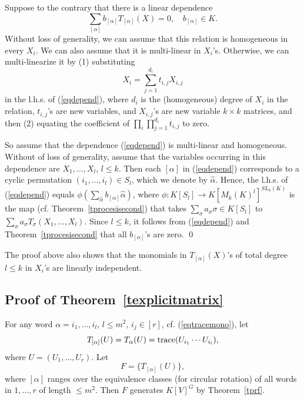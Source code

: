 \documentclass[11pt]{article}
\begin{document}
\proof 
Suppose to the contrary that there is a linear dependence 
\begin{equation} \label{eqdepend}
 \sum_{[\alpha]} b_{[\alpha]} T_{[\alpha]}(X)  = 0, \quad b_{[\alpha]} \in K.
\end{equation} 
Without loss of generality, we can assume that this relation is homogeneous 
in every $X_i$. We can also assume that it is multi-linear
in $X_i$'s. 
Otherwise, we can multi-linearize it by (1) substituting
\[ X_i=\sum_{j=1}^{d_i} t_{i,j} X_{i,j}\] 
in the l.h.s. of (\ref{eqdepend}),
where $d_i$ is the (homogeneous) degree of $X_i$ in the relation, $t_{i,j}$'s  are new variables, and $X_{i,j}$'s 
are new variable $k\times k$ matrices, and then (2)
equating  the coefficient of $\prod_i \prod_{j=1}^{d_i} t_{i,j}$ to zero.


So assume that the dependence (\ref{eqdepend})  is multi-linear and homogeneous. Without of loss of generality,
assume that the variables occurring in this dependence are $X_1,\ldots,X_l$, $l \le k$. Then each  $[\alpha]$
in (\ref{eqdepend})  corresponds to a cyclic 
permutation $(i_1,\ldots,i_l) \in S_l$, which we denote by $\hat \alpha$.
Hence, the l.h.s. of (\ref{eqdepend}) equals $\phi(\sum_{\hat \alpha} b_{[\alpha]} \hat \alpha)$,
where $\phi: K[S_l]\rightarrow K[M_k(K)^l]^{SL_k(K)}$ is the map (cf. Theorem~\ref{tprocesisecond}) that takes 
$\sum_\sigma a_\sigma \sigma \in K[S_l]$ to $\sum_\sigma a_\sigma T_\sigma(X_1,\ldots,X_l)$.  
Since $l \le k$, it  follows from  (\ref{eqdepend}) and  Theorem~\ref{tprocesisecond} that 
all $b_{[\alpha]}$'s are  zero.
\qed 

 The proof above also shows that 
the monomials in $T_{[\alpha]}(X)$'s of total 
degree $l \le k$ in $X_i$'s are linearly independent. 


\subsection{Proof of Theorem~\ref{texplicitmatrix}} \label{sproofexpmatrix}
For any word $\alpha=i_1,\ldots,i_l$, $l \le m^2$, $i_j \in [r]$, cf. (\ref{eqtracemono}), let
\begin{equation} \label{eqtraceu}
T_{[\alpha]}(U)=T_\alpha(U)={\mbox {trace}}(U_{i_1}\cdots U_{i_l}),
\end{equation}
where $U=(U_1,\ldots,U_r)$. 
Let 
\begin{equation} \label{eqFmatrix}
F=\{T_{[\alpha]}(U)\},
\end{equation} 
where $[\alpha]$ ranges over the equivalence classes (for circular rotation) of  all words in $1,\ldots,r$ of length $\le m^2$.
Then   $F$ generates $K[V]^G$ by Theorem~\ref{tprf}.  
\end{document}

